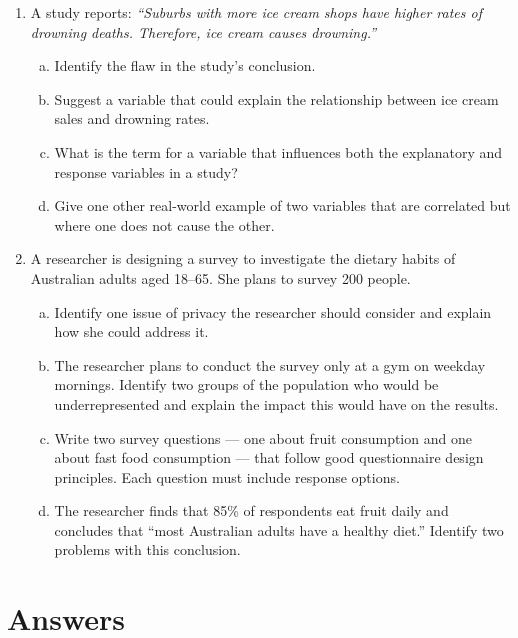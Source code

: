 \documentclass{article}
\begin{document}
\begin{enumerate}
  \item A study reports: \textit{``Suburbs with more ice cream shops have higher rates of
  drowning deaths. Therefore, ice cream causes drowning.''}
  \begin{enumerate}[(a)]
    \item Identify the flaw in the study's conclusion.
    \item Suggest a variable that could explain the relationship between ice cream sales and
    drowning rates.
    \item What is the term for a variable that influences both the explanatory and response
    variables in a study?
    \item Give one other real-world example of two variables that are correlated but where
    one does not cause the other.
  \end{enumerate}

  \item A researcher is designing a survey to investigate the dietary habits of Australian
  adults aged 18--65. She plans to survey 200 people.
  \begin{enumerate}[(a)]
    \item Identify one issue of privacy the researcher should consider and explain how she
    could address it.
    \item The researcher plans to conduct the survey only at a gym on weekday mornings.
    Identify two groups of the population who would be underrepresented and explain the impact
    this would have on the results.
    \item Write two survey questions --- one about fruit consumption and one about fast food
    consumption --- that follow good questionnaire design principles. Each question must
    include response options.
    \item The researcher finds that 85\% of respondents eat fruit daily and concludes that
    ``most Australian adults have a healthy diet.'' Identify two problems with this conclusion.
  \end{enumerate}

\end{enumerate}

\newpage
\section{Answers}
\end{document}
